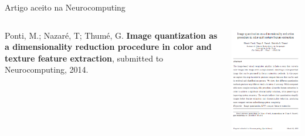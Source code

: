 \documentclass{beamer}
\begin{document}
\begin{frame}{Artigo aceito na Neurocomputing}

\begin{columns}
  \begin{column}{0.5\textwidth}
  \centering
\begin{block}{}
\justifying
\tiny{
Ponti, M.; Nazaré, T; Thumé, G. \textbf{Image quantization as a dimensionality reduction procedure in color and texture feature extraction}, submitted to Neurocomputing, 2014.}
\end{block}
  \end{column}
  \begin{column}{0.5\textwidth}
  \centering
    \includegraphics[width=0.9\linewidth]{figuras/artigo.png}
  \end{column}
\end{columns}
\end{frame}
\end{document}
